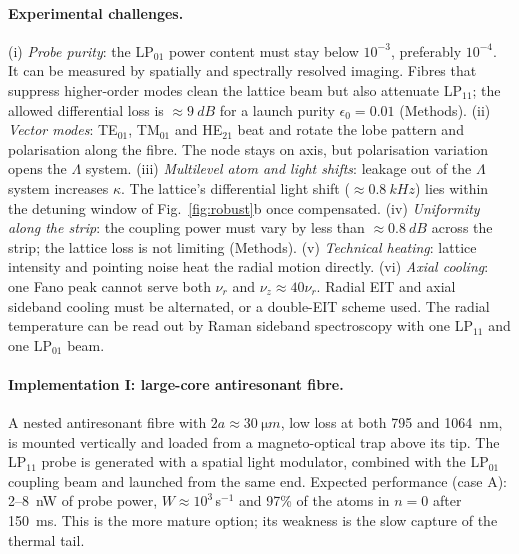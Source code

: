 \documentclass[10pt,twocolumn,a4paper]{article}
\begin{document}
\paragraph{Experimental challenges.}
(i) \emph{Probe purity}: the LP$_{01}$ power content must stay below $10^{-3}$, preferably $10^{-4}$. It can be measured by spatially and spectrally resolved imaging\cite{nicholson2008}. Fibres that suppress higher-order modes\cite{uebel2016,poletti2014} clean the lattice beam but also attenuate LP$_{11}$; the allowed differential loss is $\approx\SI{9}{dB}$ for a launch purity $\epsilon_0=0.01$ (Methods).
(ii) \emph{Vector modes}: TE$_{01}$, TM$_{01}$ and HE$_{21}$ beat and rotate the lobe pattern and polarisation along the fibre\cite{ramachandran2013}. The node stays on axis, but polarisation variation opens the $\Lambda$ system.
(iii) \emph{Multilevel atom and light shifts}: leakage out of the $\Lambda$ system increases $\kappa$. The lattice's differential light shift ($\approx\SI{0.8}{kHz}$)\cite{kuhr2005} lies within the detuning window of Fig.~\ref{fig:robust}b once compensated.
(iv) \emph{Uniformity along the strip}: the coupling power must vary by less than $\approx\SI{0.8}{dB}$ across the strip; the lattice loss is not limiting (Methods).
(v) \emph{Technical heating}: lattice intensity and pointing noise heat the radial motion directly\cite{savard1997}.
(vi) \emph{Axial cooling}: one Fano peak cannot serve both $\nu_r$ and $\nu_z\approx40\nu_r$. Radial EIT and axial sideband cooling\cite{leong2020} must be alternated, or a double-EIT scheme used\cite{scharnhorst2018}.
The radial temperature can be read out by Raman sideband spectroscopy\cite{kerman2000} with one LP$_{11}$ and one LP$_{01}$ beam.

\paragraph{Implementation I: large-core antiresonant fibre.} A nested antiresonant fibre with $2a\approx\SI{30}{\micro m}$, low loss at both 795 and \SI{1064}{nm}\cite{sakr2020}, is mounted vertically and loaded from a magneto-optical trap above its tip\cite{bajcsy2011}. The LP$_{11}$ probe is generated with a spatial light modulator\cite{flamm2013}, combined with the LP$_{01}$ coupling beam and launched from the same end. Expected performance (case A): 2--\SI{8}{nW} of probe power, $W\approx10^3$\,s$^{-1}$ and 97\% of the atoms in $n=0$ after \SI{150}{ms}. This is the more mature option; its weakness is the slow capture of the thermal tail.
\end{document}

